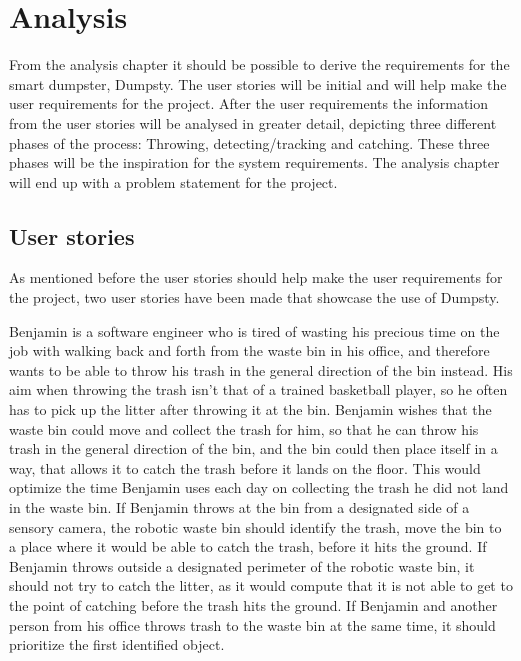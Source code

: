\chapter{Analysis}
\label{chap:Analysis}
From the analysis chapter it should be possible to derive the requirements for the smart dumpster, Dumpsty. The user stories will be initial and will help make the user requirements for the project. After the user requirements the information from the user stories will be analysed in greater detail, depicting three different phases of the process: Throwing, detecting/tracking and catching. These three phases will be the inspiration for the system requirements. 
The analysis chapter will end up with a problem statement for the project. 

\section{User stories}
\label{sec:User stories}
As mentioned before the user stories should help make the user requirements for the project, two user stories have been made that showcase the use of Dumpsty.

Benjamin is a software engineer who is tired of wasting his precious time on the job with walking back and forth from the waste bin in his office, and therefore wants to be able to throw his trash in the general direction of the bin instead. His aim when throwing the trash isn’t that of a trained basketball player, so he often has to pick up the litter after throwing it at the bin. \newline
Benjamin wishes that the waste bin could move and collect the trash for him, so that he can throw his trash in the general direction of the bin, and the bin could then place itself in a way, that allows it to catch the trash before it lands on the floor. This would optimize the time Benjamin uses each day on collecting the trash he did not land in the waste bin.\newline
If Benjamin throws at the bin from a designated side of a sensory camera, the robotic waste bin should identify the trash, move the bin to a place where it would be able to catch the trash, before it hits the ground.\newline
If Benjamin throws outside a designated perimeter of the robotic waste bin, it should not try to catch the litter, as it would compute that it is not able to get to the point of catching before the trash hits the ground.\newline
If Benjamin and another person from his office throws trash to the waste bin at the same time, it should prioritize the first identified object.

